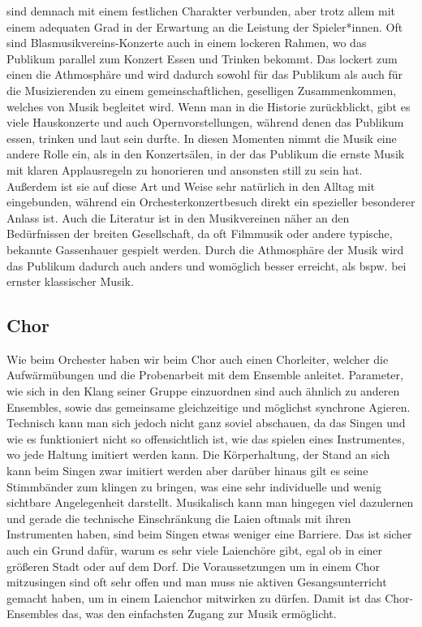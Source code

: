 sind demnach mit einem festlichen Charakter verbunden, aber trotz allem mit
einem adequaten Grad in der Erwartung an die Leistung der Spieler*innen. Oft sind
Blasmusikvereins-Konzerte auch in einem lockeren Rahmen, wo das Publikum
parallel zum Konzert Essen und Trinken bekommt. Das lockert zum einen die
Athmosphäre und wird dadurch sowohl für das Publikum als auch für die
Musizierenden zu einem gemeinschaftlichen, geselligen Zusammenkommen, welches
von Musik begleitet wird. Wenn man in die Historie zurückblickt, gibt es viele
Hauskonzerte und auch Opernvorstellungen, während denen das Publikum essen,
trinken und laut sein durfte. In diesen Momenten nimmt die Musik eine andere
Rolle ein, als in den Konzertsälen, in der das Publikum die ernste Musik mit
klaren Applausregeln zu honorieren und ansonsten still zu sein hat. Außerdem ist
sie auf diese Art und Weise sehr natürlich in den Alltag mit eingebunden,
während ein Orchesterkonzertbesuch direkt ein spezieller besonderer Anlass ist.
Auch die Literatur ist in den Musikvereinen näher an den Bedürfnissen der
breiten Gesellschaft, da oft Filmmusik oder andere typische, bekannte
Gassenhauer gespielt werden. Durch die Athmosphäre der Musik wird das Publikum
dadurch auch anders und womöglich besser erreicht, als bspw. bei ernster klassischer
Musik. 


\subsection{Chor}
Wie beim Orchester haben wir beim Chor auch einen Chorleiter, welcher die
Aufwärmübungen und die Probenarbeit mit dem Ensemble anleitet. Parameter, wie
sich in den Klang seiner Gruppe einzuordnen sind auch ähnlich zu anderen Ensembles,
sowie das gemeinsame gleichzeitige und möglichst synchrone Agieren. Technisch
kann man sich jedoch nicht ganz soviel abschauen, da das Singen und wie es
funktioniert nicht so offensichtlich ist, wie das spielen eines Instrumentes,
wo jede Haltung imitiert werden kann. Die Körperhaltung, der Stand an sich kann
beim Singen zwar imitiert werden aber darüber hinaus gilt es seine Stimmbänder
zum klingen zu bringen, was eine sehr individuelle und wenig sichtbare
Angelegenheit darstellt. Musikalisch kann man hingegen viel dazulernen und
gerade die technische Einschränkung die Laien oftmals mit ihren Instrumenten
haben, sind beim Singen etwas weniger eine Barriere. Das ist sicher auch ein
Grund dafür, warum es sehr viele Laienchöre gibt, egal ob in einer größeren
Stadt oder auf dem Dorf. Die Voraussetzungen um in einem Chor mitzusingen sind
oft sehr offen und man muss nie aktiven Gesangsunterricht gemacht haben, um in
einem Laienchor mitwirken zu dürfen. Damit ist das Chor-Ensembles das, was den
einfachsten Zugang zur Musik ermöglicht. 


